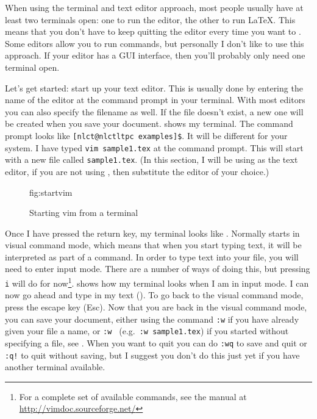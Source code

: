 When using the terminal and text editor approach, most people usually
have at least two terminals open: one to run the editor, the other to
run \LaTeX. This means that you don't have to keep quitting the
editor every time you want to . Some editors allow you to run commands, but
personally I don't like to use this approach. If your editor has a
GUI interface, then you'll probably only need one terminal open.

Let's get started: start up your text editor. This is usually done by
entering the name of the editor at the command prompt in your
terminal. With most editors you can also specify the filename as
well. If the file doesn't exist, a new one will be created when you
save your document.  shows my terminal.  The
command prompt looks like \verb|[nlct@nlctltpc examples]$|.  It will
be different for your system. I have typed \texttt{vim sample1.tex}
at the command prompt. This will start  with a new file
called \texttt{sample1.tex}.  (In this section, I will be using
 as the text editor, if you are not using
, then substitute the editor of your choice.)

\begin{figure}[htbp]
 {\caption{Starting vim from a terminal}}
 {fig:startvim}
\end{figure}

Once I have pressed the return key, my terminal looks like
. Normally  starts in visual
command mode, which means that when you start typing text, it will be
interpreted as part of a command. In order to type text into your
file, you will need to enter input mode. There are a number of ways
of doing this, but pressing \texttt{i} will do for now\footnote{For a
complete set of available commands, see the  manual at
\url{http://vimdoc.sourceforge.net/}}. 
shows how my terminal looks when I am in input mode. I can now go
ahead and type in my text (). To go back to
the visual command mode, press the escape key (Esc). Now that you are
back in the visual command mode, you can save your document, either
using the command \texttt{:w} if you have already given your file a
name, or \texttt{:w } (e.g.\ \texttt{:w sample1.tex})
if you started  without specifying a file, see
. When you want to quit  you
can do \texttt{:wq} to save and quit or \texttt{:q!} to quit without
saving, but I suggest you don't do this just yet if you have another
terminal available.

